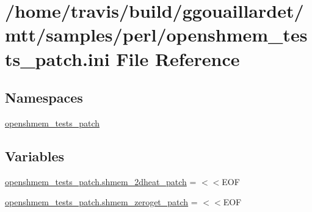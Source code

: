 \hypertarget{openshmem__tests__patch_8ini}{\section{/home/travis/build/ggouaillardet/mtt/samples/perl/openshmem\-\_\-tests\-\_\-patch.ini File Reference}
\label{openshmem__tests__patch_8ini}
}
\subsection*{Namespaces}
\begin{DoxyCompactItemize}
\item 
\hyperlink{namespaceopenshmem__tests__patch}{openshmem\-\_\-tests\-\_\-patch}
\end{DoxyCompactItemize}
\subsection*{Variables}
\begin{DoxyCompactItemize}
\item 
\hyperlink{namespaceopenshmem__tests__patch_a391991e1010e023b4787fba54765e3b1}{openshmem\-\_\-tests\-\_\-patch.\-shmem\-\_\-2dheat\-\_\-patch} = $<$$<$E\-O\-F
\item 
\hyperlink{namespaceopenshmem__tests__patch_a3aaaf9e5a26acd1ddc1ed38bee8c1366}{openshmem\-\_\-tests\-\_\-patch.\-shmem\-\_\-zeroget\-\_\-patch} = $<$$<$E\-O\-F
\end{DoxyCompactItemize}
